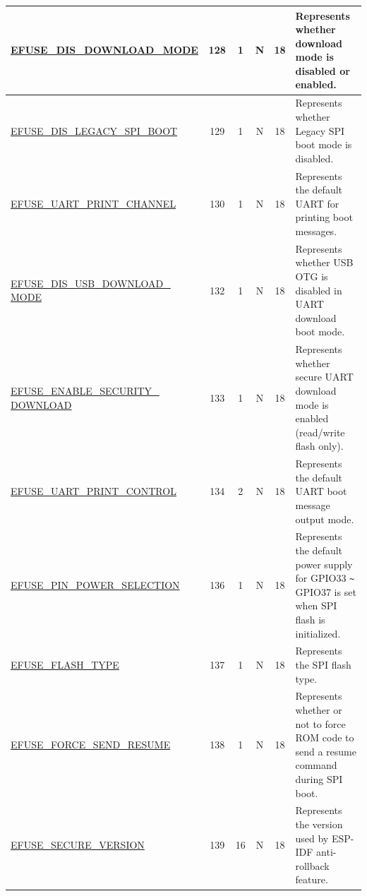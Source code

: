 \begin{longtable}[l]{ |m{5cm}|c|c|c|c|m{5cm}| }
    \hline    
    \hyperref[fielddesc:EFUSEDISDOWNLOADMODE]{EFUSE\_DIS\_DOWNLOAD\_MODE} & 128 & 1 & N & 18 & Represents whether download mode is disabled or enabled.\\ \hline
    \hyperref[fielddesc:EFUSEDISLEGACYSPIBOOT]{EFUSE\_DIS\_LEGACY\_SPI\_BOOT} & 129 & 1 & N & 18 & Represents whether Legacy SPI boot mode is disabled.\\
    \hline
    \hyperref[fielddesc:EFUSEUARTPRINTCHANNEL]{EFUSE\_UART\_PRINT\_CHANNEL} & 130 & 1 & N & 18 & Represents the default UART for printing boot messages. \\
    \hline
    \hyperref[fielddesc:EFUSEDISUSBDOWNLOADMODE]{EFUSE\_DIS\_USB\_DOWNLOAD\_ MODE} & 132 & 1 & N & 18 & Represents whether USB OTG is disabled in UART download boot mode.\\
    \hline 
    \hyperref[fielddesc:EFUSEENABLESECURITYDOWNLOAD]{EFUSE\_ENABLE\_SECURITY\_ DOWNLOAD} & 133 & 1 & N & 18 & Represents whether secure UART download mode is enabled (read/write flash only).\\
    \hline
    \hyperref[fielddesc:EFUSEUARTPRINTCONTROL]{EFUSE\_UART\_PRINT\_CONTROL} & 134 & 2 & N & 18 & Represents the default UART boot message output mode. \\
    \hline
    \hyperref[fielddesc:EFUSEPINPOWERSELECTION]{EFUSE\_PIN\_POWER\_SELECTION} & 136 & 1 & N & 18 & Represents the default power supply for GPIO33 \verb+~+ GPIO37 is set when SPI flash is initialized. \\
    \hline
    \hyperref[fielddesc:EFUSEFLASHTYPE]{EFUSE\_FLASH\_TYPE} & 137 & 1 & N & 18 & Represents the SPI flash type.\\
    \hline
    \hyperref[fielddesc:EFUSEFORCESENDRESUME]{EFUSE\_FORCE\_SEND\_RESUME} & 138 & 1 & N & 18 & Represents whether or not to force ROM code to send a resume command during SPI boot. \\  
    \hline
    \hyperref[fielddesc:EFUSESECUREVERSION]{EFUSE\_SECURE\_VERSION} & 139 & 16 & N & 18 & Represents the version used by ESP-IDF anti-rollback feature.\\
    \hline
\end{longtable}
